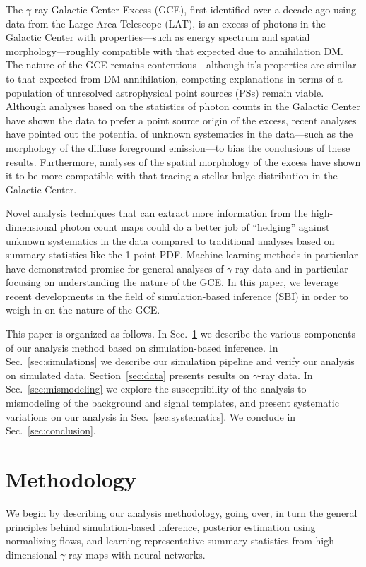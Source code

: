\documentclass[prd,aps,10pt,nofootinbib,twocolumn,superscriptaddress,preprintnumbers,balancelastpage,longbibliography]{revtex4-1}
\begin{document}
The \Fermi $\gamma$-ray Galactic Center Excess (GCE), first identified over a decade ago using data from the \Fermi Large Area Telescope (LAT), is an excess of photons in the Galactic Center with properties---such as energy spectrum and spatial morphology---roughly compatible with that expected due to annihilation DM. The nature of the GCE remains contentious---although it's properties are similar to that expected from DM annihilation, competing explanations in terms of a population of unresolved astrophysical point sources (PSs) remain viable. Although analyses based on the statistics of photon counts in the Galactic Center have shown the data to prefer a point source origin of the excess, recent analyses have pointed out the potential of unknown systematics in the data---such as the morphology of the diffuse foreground emission---to bias the conclusions of these results. Furthermore, analyses of the spatial morphology of the excess have shown it to be more compatible with that tracing a stellar bulge distribution in the Galactic Center.

Novel analysis techniques that can extract more information from the high-dimensional photon count maps could do a better job of ``hedging'' against unknown systematics in the data compared to traditional analyses based on summary statistics like the 1-point PDF. Machine learning methods in particular have demonstrated promise for general analyses of $\gamma$-ray data and in particular focusing on understanding the nature of the GCE. In this paper, we leverage recent developments in the field of simulation-based inference (SBI) in order to weigh in on the nature of the GCE.

This paper is organized as follows. In Sec.~\ref{sec:analysis} we describe the various components of our analysis method based on simulation-based inference. In Sec.~\ref{sec:simulations} we describe our simulation pipeline and verify our analysis on simulated data. Section~\ref{sec:data} presents results on \Fermi $\gamma$-ray data. In Sec.~\ref{sec:mismodeling} we explore the susceptibility of the analysis to mismodeling of the background and signal templates, and present systematic variations on our analysis in Sec.~\ref{sec:systematics}. We conclude in Sec.~\ref{sec:conclusion}.

\section{Methodology}
\label{sec:analysis}

We begin by describing our analysis methodology, going over, in turn the general principles behind simulation-based inference, posterior estimation using normalizing flows, and learning representative summary statistics from high-dimensional $\gamma$-ray maps with neural networks.
\end{document}
